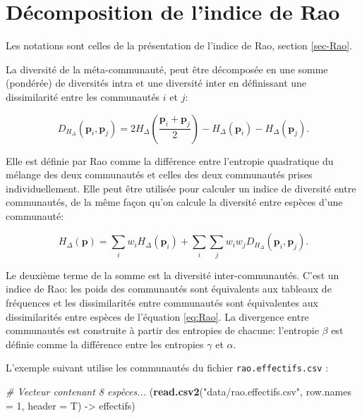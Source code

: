 \documentclass[
  11pt,
  french,
  a4paper,
  extrafontsizes,onecolumn,openright
  ]{memoir}
\newenvironment{Shaded}{\begin{snugshade}}{\end{snugshade}}
\newcommand{\AttributeTok}[1]{\textcolor[rgb]{0.13,0.29,0.53}{#1}}
\newcommand{\CommentTok}[1]{\textcolor[rgb]{0.56,0.35,0.01}{\textit{#1}}}
\newcommand{\DecValTok}[1]{\textcolor[rgb]{0.00,0.00,0.81}{#1}}
\newcommand{\FunctionTok}[1]{\textcolor[rgb]{0.13,0.29,0.53}{\textbf{#1}}}
\newcommand{\NormalTok}[1]{#1}
\newcommand{\OtherTok}[1]{\textcolor[rgb]{0.56,0.35,0.01}{#1}}
\newcommand{\StringTok}[1]{\textcolor[rgb]{0.31,0.60,0.02}{#1}}
\begin{document}
\section{Décomposition de l'indice de Rao}\label{sec-RaoDisc}

Les notations sont celles de la présentation de l'indice de Rao, section \ref{sec-Rao}.

La diversité de la méta-communauté, peut être décomposée en une somme (pondérée) de diversités intra et une diversité inter \autocite{Pavoine2004} en définissant une dissimilarité entre les communautés \(i\) et \(j\):

\begin{equation}
  \label{eq:DHdelta}
  D_{H_{\Delta }}\left(\mathbf{p}_i,\mathbf{p}_j\right)
  = 2 H_{\Delta}\left(\frac{\mathbf{p}_{i}+\mathbf{p}_j}{2}\right)
  -H_{\Delta}\left(\mathbf{p}_i\right)-H_{\Delta}\left(\mathbf{p}_j\right).
\end{equation}

Elle est définie par Rao comme la différence entre l'entropie quadratique du mélange des deux communautés et celles des deux communautés prises individuellement.
Elle peut être utilisée pour calculer un indice de diversité entre communautés, de la même façon qu'on calcule la diversité entre espèces d'une communauté:

\begin{equation}
  \label{eq:Raobeta}
  H_{\Delta }\left(\mathbf{p}\right) = \sum_i{w_i H_{\Delta }\left({\mathbf{p}}_i\right)}+\sum_i{\sum_j{w_i w_j D_{H_{\Delta }}\left({\mathbf{p}}_i,{\mathbf{p}}_j\right)}}.
\end{equation}

Le deuxième terme de la somme est la diversité inter-communautés.
C'est un indice de Rao: les poids des communautés sont équivalents aux tableaux de fréquences et les dissimilarités entre communautés sont équivalentes aux dissimilarités entre espèces de l'équation \eqref{eq:Rao}.
La divergence entre communautés est construite à partir des entropies de chacune: l'entropie \(\beta\) est définie comme la différence entre les entropies \(\gamma\) et \(\alpha\).

L'exemple suivant utilise les communautés du fichier \texttt{rao.effectifs.csv} :

\scriptsize

\begin{Shaded}
\begin{Highlighting}[]
\CommentTok{\# Vecteur contenant 8 espèces...}
\NormalTok{(}\FunctionTok{read.csv2}\NormalTok{(}\StringTok{"data/rao.effectifs.csv"}\NormalTok{, }\AttributeTok{row.names =} \DecValTok{1}\NormalTok{, }\AttributeTok{header =}\NormalTok{ T) }\OtherTok{{-}\textgreater{}}
\NormalTok{    effectifs)}
\end{Highlighting}
\end{Shaded}
\end{document}
